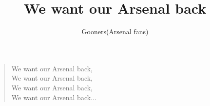 \documentclass[a4paper,12pt]{article}
\title{We want our Arsenal back}
\author{Gooners(Arsenal fans)}
\date{}
\begin{document}
	
	\maketitle
	
	\begin{verse}
		
		We want our Arsenal back, \\
		We want our Arsenal back, \\
		We want our Arsenal back, \\
		We want our Arsenal back$\ldots$
		
	\end{verse}
	
\end{document}
